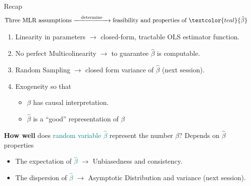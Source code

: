 \documentclass[11pt, aspectratio = 169]{beamer}
\begin{document}
\begin{frame}[fragile]{Recap}
$$
\text{Three MLR assumptions} \xrightarrow{\quad \text{determine} \quad} \text{feasibility and properties of } \textcolor{teal}{\hat{\beta}}
$$
\vspace{-0.5cm}
\begin{enumerate}
        \item Linearity in parameters $\rightarrow$ closed-form, tractable OLS estimator function.
        \item No perfect Multicolinearity $\rightarrow$ to guarantee $\hat{\beta}$ is computable.
        \item Random Sampling $\rightarrow$ closed form variance of $\hat{\beta}$ (next session).
        \item Exogeneity so that
        \begin{itemize}
            \item[$\rightarrow$] $\beta$ has causal interpretation. 
            \pause
            \item[$\rightarrow$] $\hat{\beta}$ is a ``good'' representation of $\beta$
        \end{itemize}
\end{enumerate}
\pause
\textbf{How well} does \textcolor{teal}{random variable} \textcolor{teal}{$\hat{\beta}$} represent the \alert{number} \alert{$\beta$}? Depends on $\hat{\beta}$ properties
\vspace{-0.2cm}
    \begin{itemize}
        \item The expectation of \textcolor{teal}{$\hat{\beta}$} $\rightarrow$ Unbiasedness and consistency.
        \item The dispersion of \textcolor{teal}{$\hat{\beta}$} $\rightarrow$ Asymptotic Distribution and variance (next session).
    \end{itemize}
\end{frame}

\end{document}
